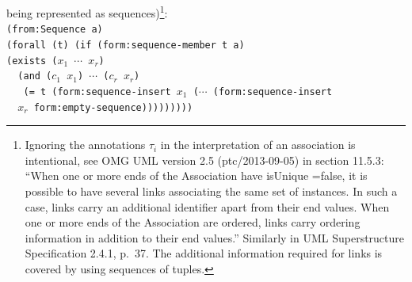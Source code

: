 \documentclass[10pt,fleqn,final]{scrreprt}
\newcommand{\cbs}[0]{\color{red}\xspace} %
\newcommand{\cbe}[0]{\color{black}\xspace} %
\newenvironment{definitions}[0]{\medskip }{}
\newcommand{\white}[1]{{\color{white}{#1}}}
\newcommand{\qqquad}{\white{x}\qquad}
\begin{document}
\begin{definitions}
\begin{itemize}
being represented as sequences)\footnote{Ignoring the annotations $\tau_i$ in the interpretation of an association is intentional, see OMG UML version 2.5 (ptc/2013-09-05) in section 11.5.3: ``When one or more ends of the Association have isUnique =false, it is possible to have several links associating the same set of
instances. In such a case, links carry an additional identifier apart from their end values.
When one or more ends of the Association are ordered, links carry ordering information in addition to their end values.'' Similarly in UML Superstructure Specification 2.4.1, p.~37. \cbs The additional information required for links is covered by using sequences of tuples.}:\cbe\\
\texttt{(from:Sequence a)}\\
\texttt{(forall (t) (if (form:sequence-member t a)\\
\qqquad\qqquad  (exists ($x_1$ $\cdots$ $x_r$)\\
\qqquad\qqquad\qqquad\ \  (and ($c_1$ $x_1$) $\cdots$ ($c_r$ $x_r$)\\
\ \ \  (= t (form:sequence-insert $x_1$ ($\cdots$ (form:sequence-insert\\
\qqquad\qqquad\qqquad\ \  $x_r$ form:empty-sequence)))))))))}


\end{itemize}
\end{definitions}
\end{document}

